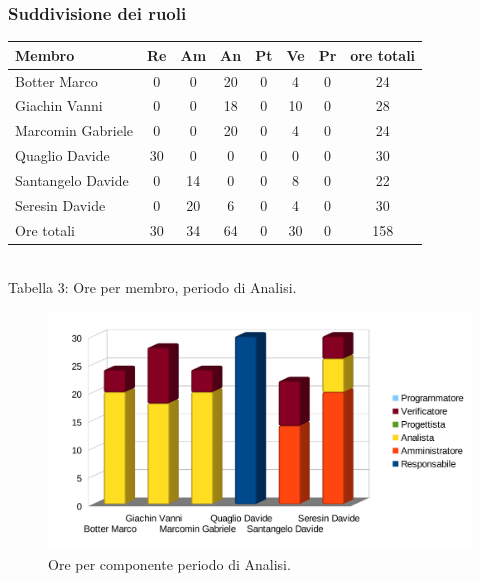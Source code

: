 \subsubsection{Suddivisione dei ruoli}
\begin{center}
\begin{tabular}{| l | c | c | c | c | c | c | c |}
\hline
Membro & Re & Am & An & Pt & Ve & Pr & ore totali \\
\hline
Botter Marco & 0 & 0 & 20 & 0 & 4 & 0 & 24 \\

Giachin Vanni & 0 & 0 & 18 & 0 & 10 & 0 & 28 \\

Marcomin Gabriele & 0 & 0 & 20 & 0 & 4 & 0 & 24 \\

Quaglio Davide & 30 & 0 & 0 & 0 & 0 & 0 & 30 \\

Santangelo Davide & 0 & 14 & 0 & 0 & 8 & 0 & 22 \\

Seresin Davide & 0 & 20 & 6 & 0 & 4 & 0 & 30 \\
\hline
Ore totali & 30 & 34 & 64 & 0 & 30 & 0 & 158 \\
\hline
\end{tabular}
\\
Tabella 3: Ore per membro, periodo di Analisi.
\end{center}
\begin{figure}[H] \centering \includegraphics[width=%
\textwidth]
{../modello/img/1.png} \caption{ Ore per componente periodo di Analisi.}
\end{figure}
